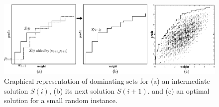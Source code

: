 \documentclass{article}
\begin{document}
\begin{figure}
  \includegraphics[width=\textwidth]{pareto}
  \caption{Graphical representation of dominating sets for
  (a) an intermediate solution $S(i)$, (b) its next solution $S(i+1)$. and
  (c) an optimal solution for a small random instance.}
  \label{fig:pareto}
\end{figure}



\end{document}
